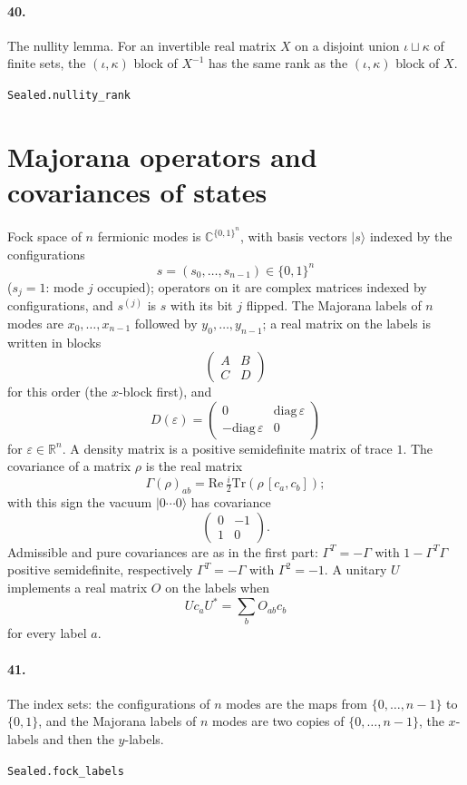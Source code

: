 \documentclass[11pt]{article}
\begin{document}
\paragraph{40.} The nullity lemma. For an invertible real matrix $X$ on a disjoint union $\iota \sqcup \kappa$ of finite sets, the $(\iota, \kappa)$ block of $X^{-1}$ has the same rank as the $(\iota, \kappa)$ block of $X$.\par{\footnotesize\texttt{Sealed.nullity\_rank}}

\section*{Majorana operators and covariances of states}
Fock space of $n$ fermionic modes is $\mathbb C^{\{0,1\}^n}$, with basis vectors $|s\rangle$ indexed by the configurations \[s = (s_0, \dots, s_{n-1}) \in \{0,1\}^n\] ($s_j = 1$: mode $j$ occupied); operators on it are complex matrices indexed by configurations, and $s^{(j)}$ is $s$ with its bit $j$ flipped. The Majorana labels of $n$ modes are $x_0, \dots, x_{n-1}$ followed by $y_0, \dots, y_{n-1}$; a real matrix on the labels is written in blocks \[\begin{pmatrix} A & B \\ C & D \end{pmatrix}\] for this order (the $x$-block first), and \[D(\varepsilon) = \begin{pmatrix} 0 & \mathrm{diag}\,\varepsilon \\ -\mathrm{diag}\,\varepsilon & 0 \end{pmatrix}\] for $\varepsilon \in \mathbb R^n$. A density matrix is a positive semidefinite matrix of trace $1$. The covariance of a matrix $\rho$ is the real matrix \[\Gamma(\rho)_{ab} = \mathrm{Re}\,\tfrac i2 \mathrm{Tr}(\rho\,[c_a, c_b]);\] with this sign the vacuum $|0\cdots0\rangle$ has covariance \[\begin{pmatrix} 0 & -1 \\ 1 & 0 \end{pmatrix}.\] Admissible and pure covariances are as in the first part: $\Gamma^T = -\Gamma$ with $1 - \Gamma^T\Gamma$ positive semidefinite, respectively $\Gamma^T = -\Gamma$ with $\Gamma^2 = -1$. A unitary $U$ implements a real matrix $O$ on the labels when \[U c_a U^* = \sum_b O_{ab} c_b\] for every label $a$.

\paragraph{41.} The index sets: the configurations of $n$ modes are the maps from $\{0, \dots, n-1\}$ to $\{0, 1\}$, and the Majorana labels of $n$ modes are two copies of $\{0, \dots, n-1\}$, the $x$-labels and then the $y$-labels.\par{\footnotesize\texttt{Sealed.fock\_labels}}
\end{document}
